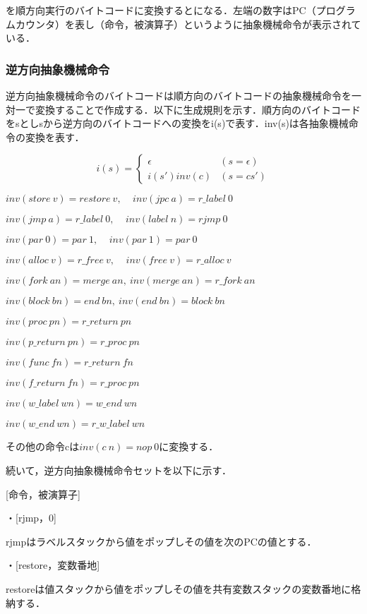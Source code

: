 \documentclass[submit,PRO]{ipsj}
\begin{document}
を順方向実行のバイトコードに変換するとになる．左端の数字はPC（プログラムカウンタ）を表し（命令，被演算子）というように抽象機械命令が表示されている．

\subsubsection{逆方向抽象機械命令}

逆方向抽象機械命令のバイトコードは順方向のバイトコードの抽象機械命令を一対一で変換することで作成する．以下に生成規則を示す．順方向のバイトコードをsとしsから逆方向のバイトコードへの変換をi(s)で表す．inv(s)は各抽象機械命令の変換を表す．

\[
  i(s) = \left\{ \begin{array}{ll}
    \epsilon & (s=\epsilon) \\
    i(s')inv(c) & (s=cs')
  \end{array} \right.
\]

$inv(store\ v)= restore\ v,\ \ \ \ \ inv(jpc\ a)=r\_label\ 0 $

$inv(jmp\ a)=r\_label\ 0,\ \ \ \ \ inv(label\ n)=rjmp\ 0$

$inv(par\ 0)=par\ 1,\ \ \ \ \ inv(par\ 1)=par\ 0$

$inv(alloc\ v)=r\_free\ v,\ \ \ \ \ inv(free\ v)=r\_alloc\ v$

$inv(fork\ an)=merge\ an,\ inv(merge\ an)=r\_fork\ an$

$inv(block\ bn)=end\ bn,\  inv(end\ bn)=block\ bn$

$inv(proc\ pn)=r\_return\ pn$

$inv(p\_return\ pn)=r\_proc\ pn$

$inv(func\ fn)=r\_return\ fn$

$inv(f\_return\ fn)=r\_proc\ pn$

$inv(w\_label\ wn)=w\_end\ wn$

$inv(w\_end\ wn)=r\_w\_label\ wn$

その他の命令cは$inv(c\ n)=nop\ 0$に変換する．


続いて，逆方向抽象機械命令セットを以下に示す．

[命令，被演算子]

・[rjmp，0]

rjmpはラベルスタックから値をポップしその値を次のPCの値とする．


・[restore，変数番地]

restoreは値スタックから値をポップしその値を共有変数スタックの変数番地に格納する．
\end{document}
